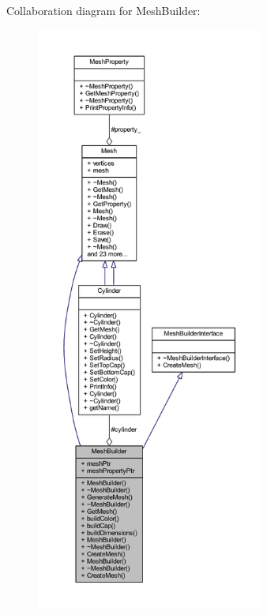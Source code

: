 Collaboration diagram for Mesh\+Builder\+:\nopagebreak
\begin{figure}[H]
\begin{center}
\leavevmode
\includegraphics[height=550pt]{class_mesh_builder__coll__graph}
\end{center}
\end{figure}
